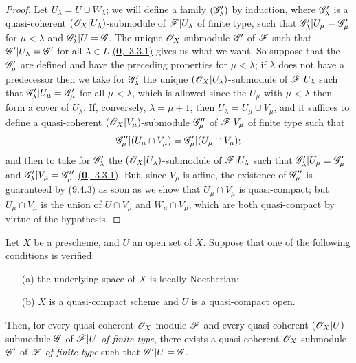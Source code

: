 \begin{proof}
\label{proof-lem-1.9.4.6}
Let $U_\lambda=U\cup W_\lambda$; we will define a family $(\mathscr{G}'_\lambda)$ by induction,
where $\mathscr{G}'_\lambda$ is a quasi-coherent $(\mathscr{O}_X|U_\lambda)$-submodule of
$\mathscr{F}|U_\lambda$ of finite type, such that $\mathscr{G}'_\lambda|U_\mu=\mathscr{G}'_\mu$ for
$\mu<\lambda$ and $\mathscr{G}'_\lambda|U=\mathscr{G}$. The unique $\mathscr{O}_X$-submodule $\mathscr{G}'$ of
$\mathscr{F}$ such that $\mathscr{G}'|U_\lambda=\mathscr{G}'$ for all $\lambda\in L$ \hyperref[env-0.3.3.1]{(\textbf{0},~3.3.1)} gives
us what we want. So suppose that the $\mathscr{G}'_\mu$ are defined and have the preceding
properties for $\mu<\lambda$; if $\lambda$ does not have a predecessor then we take for
$\mathscr{G}'_\lambda$ the unique $(\mathscr{O}_X|U_\lambda)$-submodule of $\mathscr{F}|U_\lambda$ such that
$\mathscr{G}'_\lambda|U_\mu=\mathscr{G}'_\mu$ for all $\mu<\lambda$, which is allowed since the $U_\mu$
with $\mu<\lambda$ then form a cover of $U_\lambda$. If, conversely, $\lambda=\mu+1$, then
$U_\lambda=U_\mu\cup V_\mu$, and it suffices to define a quasi-coherent
$(\mathscr{O}_X|V_\mu)$-submodule $\mathscr{G}''_\mu$ of $\mathscr{F}|V_\mu$ of finite type such that
\[
  \mathscr{G}''_\mu|(U_\mu\cap V_\mu)=\mathscr{G}'_\mu|(U_\mu\cap V_\mu);
\]
and then to take for $\mathscr{G}'_\lambda$ the $(\mathscr{O}_X|U_\lambda)$-submodule of
$\mathscr{F}|U_\lambda$ such that $\mathscr{G}'_\lambda|U_\mu=\mathscr{G}'_\mu$ and
$\mathscr{G}'_\lambda|V_\mu=\mathscr{G}''_\mu$ \hyperref[env-0.3.3.1]{(\textbf{0},~3.3.1)}. But, since $V_\mu$ is affine, the
existence of $\mathscr{G}''_\mu$ is guaranteed by \hyperref[cor-1.9.4.3]{(9.4.3)} as soon as we show that
$U_\mu\cap V_\mu$ is quasi-compact; but $U_\mu\cap V_\mu$ is the union of $U\cap V_\mu$ and
$W_\mu\cap V_\mu$, which are both quasi-compact by virtue of the hypothesis.
\end{proof}

\begin{thm}[9.4.7]
\label{thm-1.9.4.7}
Let $X$ be a prescheme, and $U$ an open set of $X$. Suppose that one of the following
conditions is verified:
\begin{itemize}
  \item[{\rm(a)}] the underlying space of $X$ is locally Noetherian;
  \item[{\rm(b)}] $X$ is a quasi-compact scheme and $U$ is a quasi-compact open.
\end{itemize}
Then, for every quasi-coherent $\mathscr{O}_X$-module $\mathscr{F}$ and every quasi-coherent
$(\mathscr{O}_X|U)$-submodule $\mathscr{G}$ of $\mathscr{F}|U$ {\it of finite type}, there exists a
quasi-coherent $\mathscr{O}_X$-submodule $\mathscr{G}'$ of $\mathscr{F}$ {\it of finite type} such that
$\mathscr{G}'|U=\mathscr{G}$.
\end{thm}

